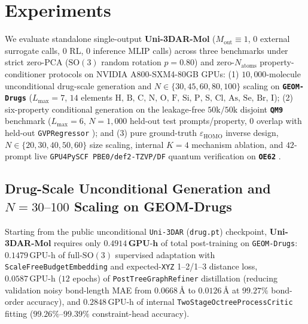 \documentclass[11pt,a4paper]{article}
\begin{document}
\section{Experiments}
\label{sec:experiments}

We evaluate standalone single-output \textbf{Uni-3DAR-Mol} ($M_{\text{out}} \equiv 1$, $0$ external surrogate calls, $0$ RL, $0$ inference MLIP calls) across three benchmarks under strict zero-PCA ($\text{SO}(3)$ random rotation $p=0.80$) and zero-$N_{\text{atoms}}$ property-conditioner protocols on NVIDIA A800-SXM4-80GB GPUs: (1) $10{,}000$-molecule unconditional drug-scale generation and $N \in \{30, 45, 60, 80, 100\}$ scaling on \textbf{\texttt{GEOM-Drugs}} \citep{axelrod2022geom} ($L_{\max}=7$, $14$ elements $\text{H, B, C, N, O, F, Si, P, S, Cl, As, Se, Br, I}$); (2) six-property conditional generation on the leakage-free $50\text{k}/50\text{k}$ disjoint \textbf{\texttt{QM9}} benchmark \citep{ramakrishnan2014qm9,zeng2026propmolflow} ($L_{\max}=6$, $N=1{,}000$ held-out test prompts/property, $0$ overlap with held-out \texttt{GVPRegressor} \citep{jing2021gvp}); and (3) pure ground-truth $\varepsilon_{\text{HOMO}}$ inverse design, $N \in \{20, 30, 40, 50, 60\}$ size scaling, internal $K=4$ mechanism ablation, and $42$-prompt live \texttt{GPU4PySCF PBE0/def2-TZVP/DF} \citep{sun2020pyscf,li2024gpu4pyscf} quantum verification on \textbf{\texttt{OE62}} \citep{stuke2020oe62}.

\subsection{Drug-Scale Unconditional Generation and $N=30\text{--}100$ Scaling on GEOM-Drugs}
\label{sec:exp_geom}

Starting from the public unconditional \texttt{Uni-3DAR} (\texttt{drug.pt}) checkpoint, \textbf{Uni-3DAR-Mol} requires only $\mathbf{0.4914\,\text{GPU-h}}$ of total post-training on \texttt{GEOM-Drugs}: $0.1479\,\text{GPU-h}$ of full-$\text{SO}(3)$ supervised adaptation with \texttt{ScaleFree\allowbreak Budget\allowbreak Embedding} and expected-\texttt{XYZ} 1--2/1--3 distance loss, $0.0587\,\text{GPU-h}$ ($12$ epochs) of \texttt{PostTree\allowbreak Graph\allowbreak Refiner} distillation (reducing validation noisy bond-length MAE from $0.0668\,\text{\AA}$ to $\mathbf{0.0126\,\text{\AA}}$ at $\mathbf{99.27\%}$ bond-order accuracy), and $0.2848\,\text{GPU-h}$ of internal \texttt{TwoStage\allowbreak Octree\allowbreak ProcessCritic} fitting ($99.26\%\text{--}99.39\%$ constraint-head accuracy).
\end{document}
